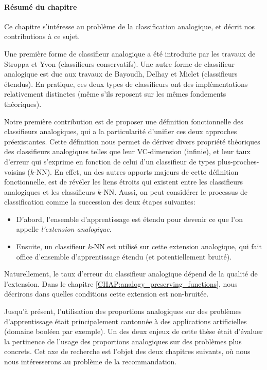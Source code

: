 \paragraph{Résumé du chapitre}
Ce chapitre s'intéresse au problème de la classification analogique, et décrit
nos contributions à ce sujet.

Une première forme de classifieur analogique a été introduite par les travaux
de Stroppa et Yvon  \cite{StrYvoCNLL05} (classifieurs conservatifs). Une autre
forme de classifieur analogique est due aux travaux de Bayoudh, Delhay et
Miclet \cite{MicBayDelJAIR08, BayMicDelIJCAI07} (classifieurs étendus).
En pratique, ces deux types de classifieurs ont des implémentations
relativement distinctes (même s'ils reposent sur les mêmes fondements
théoriques).

Notre première contribution est de proposer une définition fonctionnelle des
classifieurs analogiques, qui a la particularité d'unifier ces deux approches
préexistantes. Cette définition nous permet de dériver divers propriété
théoriques des classifieurs analogiques telles que leur VC-dimension (infinie),
et leur taux d'erreur qui s'exprime en fonction de celui d'un classifieur de
types plus-proches-voisins ($k$-NN). En effet, un des autres apports majeurs de
cette définition fonctionnelle, est de révéler les liens étroits qui existent
entre les classifieurs analogiques et les classifieurs $k$-NN. Aussi, on peut
considérer le processus de classification comme la succession des deux étapes
suivantes:

\begin{itemize}
  \item D'abord, l'ensemble d'apprentissage est étendu pour devenir ce que l'on
    appelle \textit{l'extension analogique}.
  \item Ensuite, un classifieur $k$-NN est utilisé sur cette extension
    analogique, qui fait office d'ensemble d'apprentissage étendu (et
    potentiellement bruité).
\end{itemize}

Naturellement, le taux d'erreur du classifieur analogique dépend de la qualité
de l'extension. Dans le chapitre \ref{CHAP:analogy_preserving_functions}, nous
décrirons dans quelles conditions cette extension est non-bruitée.


Jusqu'à présent, l'utilisation des proportions analogiques sur des problèmes
d'apprentissage était principalement cantonnée à des applications artificielles
(domaine booléen par exemple). Un des deux enjeux de cette thèse était
d'évaluer la pertinence de l'usage des proportions analogiques sur des
problèmes plus concrets. Cet axe de recherche est l'objet des deux chapitres
suivants, où nous nous intéresserons au problème de la recommandation.
